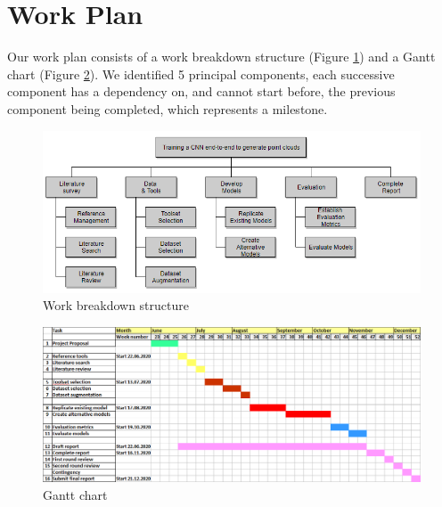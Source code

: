 \section{Work Plan}

Our work plan consists of a work breakdown structure (Figure \ref{fig:workplan}) and a Gantt chart (Figure \ref{fig:gantt-chart}).
We identified 5 principal components, each successive component has a dependency on, and cannot start before, the previous component being completed, which represents a milestone.

\begin{figure}[h]
\centering\includegraphics[width=1\linewidth]{figures/point-cloud-wbs.png}
\caption{Work breakdown structure}
\label{fig:workplan}
\end{figure}

\begin{figure}[h]
\begin{center}
\includegraphics[scale=0.55] {figures/point-cloud-gantt-chart.png}
\caption{Gantt chart}
\label{fig:gantt-chart}
\end{center}
\end{figure}




